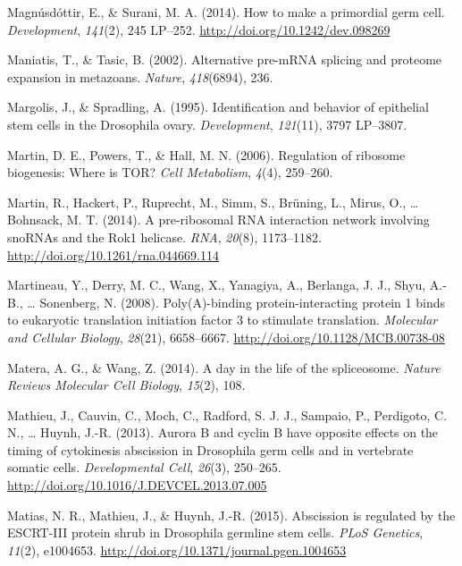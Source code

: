 \documentclass[12pt,twoside]{reedthesis}
\newlength{\cslhangindent}
\newenvironment{cslreferences}%
  {\setlength{\parindent}{0pt}%
  \everypar{\setlength{\hangindent}{\cslhangindent}}\ignorespaces}%
  {\par}
\begin{document}
\begin{cslreferences}
\leavevmode\hypertarget{ref-Magnusdottir2014d}{}%
Magnúsdóttir, E., \& Surani, M. A. (2014). How to make a primordial germ cell. \emph{Development}, \emph{141}(2), 245 LP--252. \url{http://doi.org/10.1242/dev.098269}

\leavevmode\hypertarget{ref-Maniatis2002}{}%
Maniatis, T., \& Tasic, B. (2002). Alternative pre-mRNA splicing and proteome expansion in metazoans. \emph{Nature}, \emph{418}(6894), 236.

\leavevmode\hypertarget{ref-Margolis1995a}{}%
Margolis, J., \& Spradling, A. (1995). Identification and behavior of epithelial stem cells in the Drosophila ovary. \emph{Development}, \emph{121}(11), 3797 LP--3807.

\leavevmode\hypertarget{ref-Martin2006a}{}%
Martin, D. E., Powers, T., \& Hall, M. N. (2006). Regulation of ribosome biogenesis: Where is TOR? \emph{Cell Metabolism}, \emph{4}(4), 259--260.

\leavevmode\hypertarget{ref-martinPreribosomalRNAInteraction2014}{}%
Martin, R., Hackert, P., Ruprecht, M., Simm, S., Brüning, L., Mirus, O., \ldots{} Bohnsack, M. T. (2014). A pre-ribosomal RNA interaction network involving snoRNAs and the Rok1 helicase. \emph{RNA}, \emph{20}(8), 1173--1182. \url{http://doi.org/10.1261/rna.044669.114}

\leavevmode\hypertarget{ref-Martineau2008c}{}%
Martineau, Y., Derry, M. C., Wang, X., Yanagiya, A., Berlanga, J. J., Shyu, A.-B., \ldots{} Sonenberg, N. (2008). Poly(A)-binding protein-interacting protein 1 binds to eukaryotic translation initiation factor 3 to stimulate translation. \emph{Molecular and Cellular Biology}, \emph{28}(21), 6658--6667. \url{http://doi.org/10.1128/MCB.00738-08}

\leavevmode\hypertarget{ref-Matera2014}{}%
Matera, A. G., \& Wang, Z. (2014). A day in the life of the spliceosome. \emph{Nature Reviews Molecular Cell Biology}, \emph{15}(2), 108.

\leavevmode\hypertarget{ref-Mathieu2013d}{}%
Mathieu, J., Cauvin, C., Moch, C., Radford, S. J. J., Sampaio, P., Perdigoto, C. N., \ldots{} Huynh, J.-R. (2013). Aurora B and cyclin B have opposite effects on the timing of cytokinesis abscission in Drosophila germ cells and in vertebrate somatic cells. \emph{Developmental Cell}, \emph{26}(3), 250--265. \url{http://doi.org/10.1016/J.DEVCEL.2013.07.005}

\leavevmode\hypertarget{ref-Matias2015g}{}%
Matias, N. R., Mathieu, J., \& Huynh, J.-R. (2015). Abscission is regulated by the ESCRT-III protein shrub in Drosophila germline stem cells. \emph{PLoS Genetics}, \emph{11}(2), e1004653. \url{http://doi.org/10.1371/journal.pgen.1004653}


\end{cslreferences}
\end{document}
